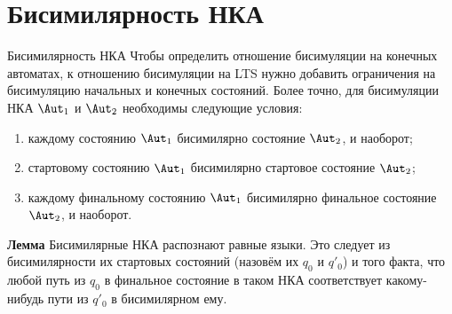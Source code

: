 \section{Бисимилярность НКА}
\begin{frame}{Бисимилярность НКА}
Чтобы определить отношение бисимуляции на конечных автоматах, к отношению бисимуляции на LTS нужно добавить ограничения на бисимуляцию начальных и конечных состояний. Более точно, для бисимуляции НКА $\Aut_1$ и $\Aut_2$ необходимы следующие условия: %
\begin{enumerate}
\item каждому состоянию $\Aut_1$ бисимилярно состояние $\Aut_2$, и наоборот;
\item стартовому состоянию $\Aut_1$ бисимилярно стартовое состояние $\Aut_2$;
\item каждому финальному состоянию $\Aut_1$ бисимилярно финальное состояние $\Aut_2$, и наоборот.
\end{enumerate} %

\begin{exampleblock}{\bf Лемма}
Бисимилярные НКА распознают равные языки. Это следует из бисимилярности их стартовых состояний (назовём их $q_0$ и $q'_0$) и того факта, что любой путь из $q_0$ в финальное состояние в таком НКА соответствует какому-нибудь пути из $q'_0$ в бисимилярном ему.
\end{exampleblock} %

\end{frame}

